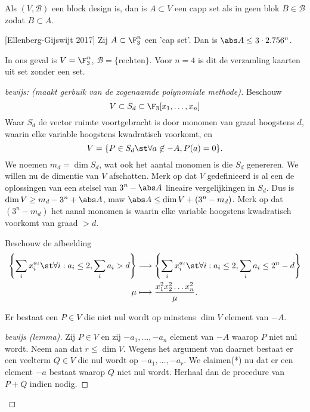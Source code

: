 
\begin{definitie}
	Als $(V, \mathcal{B} ) $ een block design is, dan is $A \subset  V$ een capp set als in geen blok $B \in \mathcal{B} $ zodat $B \subset A$.
\end{definitie}

\begin{stelling}\label{st:ellenberg_gijswijt}
	[Ellenberg-Gijswijt 2017]
	Zij $A \subset  \F_3^{n}$ een 'cap set'. Dan is $\abs A \le 3\cdot 2.756^{n}$. 
\end{stelling}
In ons geval is $V = \F_3^{n}$, $\mathcal{B} = \{\text{rechten}\} $. Voor $n = 4$ is dit de verzamling kaarten uit set zonder een set.

\begin{proof}
	[bewijs: (maakt gerbuik van de zogenaamde polynomiale methode)]

Beschouw \[
V \subset S_d \subset \F_3[x_1, \ldots, x_n]
\]
	Waar $S_d$ de vector ruimte voortgebracht is door monomen van graad hoogstens $d$, waarin elke variable hoogstens kwadratisch voorkomt, en  
\[
	V = \{ P \in S_d \st \forall  a \not\in -A, P(a) = 0\} 
.\]
We noemen $m_d = \dim S_d$, wat ook het aantal monomen is die $S_d$ genereren. We willen nu de dimentie van $V$ afschatten.
Merk op dat $V$ gedefinieerd is al een de oplossingen van een stelsel van $3^{n} - \abs A$ lineaire vergelijkingen in $S_d$. 
Dus is $\dim V \ge m_d  - 3^{n} + \abs A$, maw $\abs A \le \dim V + (3^{n} - m_d)$. 
Merk op dat $(3^{n} - m_d)$ het aanal monomen is waarin elke variable hoogstens kwadratisch voorkomt van graad $> d$. 

Beschouw de afbeelding
\begin{align*}
	\left\{\sum_{i}x_i^{a_i} \st \forall i: a_i \le 2, \sum_{i} a_i > d \right\}  &\longrightarrow  	\left\{\sum_{i}x_i^{a_i} \st \forall i: a_i \le 2, \sum_{i} a_i \le 2^{n} - d \right\}  \\
	 \mu &\longmapsto \frac{x_1^2 x_2^2 \ldots x_n^2}{\mu}
.\end{align*}

\begin{lemma}
	Er bestaat een $P \in V$ die niet nul wordt op minstens $\dim V$ element van $-A$. 
\end{lemma}
\begin{proof}
	[bewijs (lemma)]
	Zij $P \in V$ en zij $-a_1, \ldots, -a_n$ element van $-A$ waarop $P$ niet nul wordt. Neem aan dat $r \le \dim V$. 	
	Wegens het argument van daarnet bestaat er een veelterm $Q \in V$ die nul wordt op $-a_1, \ldots, -a_r$. 
	We claimen(*) nu dat er een element $-a$ bestaat waarop $Q$ niet nul wordt. 
	Herhaal dan de procedure van $P + Q$ indien nodig. 


\end{proof}
\end{proof}
